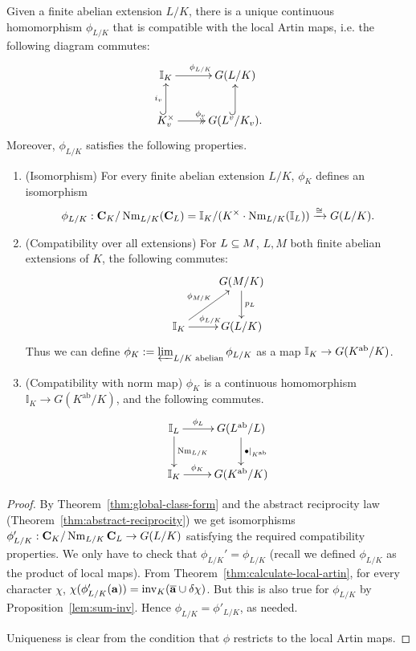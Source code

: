 \begin{thm*}
Given a finite abelian extension $L/K$, there is a unique continuous %
homomorphism $\phi_{L/K}$ that is compatible with the local Artin maps, i.e. the following diagram commutes: %
\[
\xymatrix{
\mathbb I_K\ar[r]^{\phi_{L/K}}&G(L/K)\\
K_v^{\times}\ar@{->>}[r]^{\phi_v}\ar@{^(->}[u]^{i_v}&
G(L^v/K_v).\ar@{^(->}[u]
}
\]
Moreover, $\phi_{L/K}$ satisfies the following properties.
\begin{enumerate}
\item (Isomorphism) For every finite abelian extension $L/K$, $\phi_K$ defines an isomorphism
\[
\phi_{L/K}:
\mathbf C_K/\operatorname{Nm}_{L/K}(\mathbf C_L)=
\mathbb I_K/(K^{\times}\cdot \operatorname{Nm}_{L/K}(\mathbb I_L))\xrightarrow{\cong} G(L/K).
\]
\item (Compatibility over all extensions) For $L\subseteq M$, $L,M$ both finite abelian extensions of $K$, the following commutes:
\[
\xymatrix{
& G(M/K)\ar[d]^{p_L}\\
\I_K\ar[ru]^{\phi_{M/K}}\ar[r]^{\phi_{L/K}}& G(L/K)
}
\]
Thus we can define $\phi_K:=\varprojlim_{L/K\text{ abelian}} \phi_{L/K}$ as a map $\mathbb{I}_K\to G(K^{\text{ab}}/K)$.
\item (Compatibility with norm map) $\phi_K$ is a continuous homomorphism $\mathbb{I}_K\to G(K^{\text{ab}}/K)$, and the following commutes.
\[
\xymatrix{
\I_L\ar[r]^-{\phi_L} \ar[d]^{\nm_{L/K}}& G(L^{\text{ab}}/L)\ar[d]^{\bullet|_{K^{\text{ab}}}}\\
\I_K\ar[r]^-{\phi_K}&  G(K^{\text{ab}}/K)
}
\]
\end{enumerate}
\end{thm*}
\begin{proof}
By Theorem~\ref{thm:global-class-form} and the abstract reciprocity law (Theorem~\ref{thm:abstract-reciprocity}) we get isomorphisms $\phi_{L/K}':\mathbf C_K/\operatorname{Nm}_{L/K}\mathbf C_L\to G(L/K)$ satisfying the required compatibility properties. We only have to check that $\phi_{L/K}'=\phi_{L/K}$ (recall we defined $\phi_{L/K}$ as the product of local maps).
From Theorem~\ref{thm:calculate-local-artin}, for every character $\chi$, $\chi(\phi'_{L/K}(\mathbf a))=\operatorname{inv}_K(\overline{\mathbf a}\cup \delta\chi)$. But this is also true for $\phi_{L/K}$ by Proposition~\ref{lem:sum-inv}. Hence $\phi_{L/K}=\phi'_{L/K}$, as needed.

Uniqueness is clear from the condition that $\phi$ restricts to the local Artin maps.
\end{proof}
